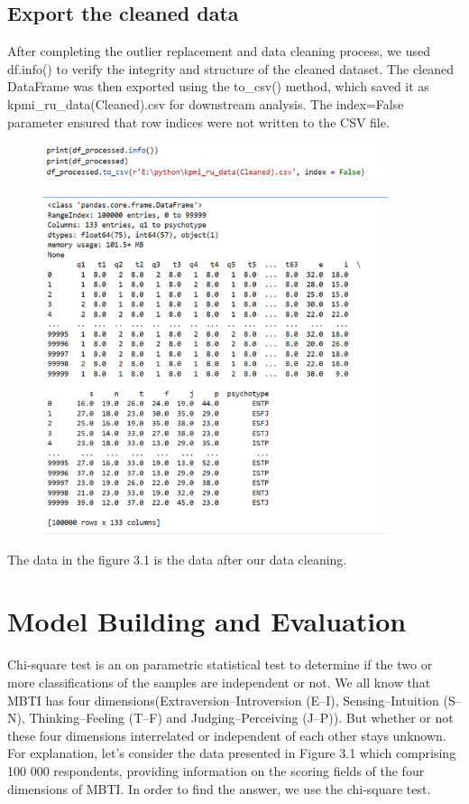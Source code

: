 \documentclass[12pt]{article}
\begin{document}
	\subsection{Export the cleaned data}
	After completing the outlier replacement and data cleaning process, we used df.info() to verify the integrity and structure of the cleaned dataset. The cleaned DataFrame was then exported using the to\_csv() method, which saved it as kpmi\_ru\_data(Cleaned).csv for downstream analysis. The index=False parameter ensured that row indices were not written to the CSV file.
	\begin{figure}[H]
		\centering
		\includegraphics[width=0.9\textwidth]{Q1P6}
		
	\end{figure}
	\begin{figure}[H]
		\centering
		\includegraphics[width=0.9\textwidth]{Q1P7}
		
	\end{figure}
	The data in the figure 3.1 is the data after our data cleaning.
	
	\section{Model Building and Evaluation}
	Chi-square test is an on parametric statistical test to determine if the two or more classifications of the samples are independent or not\cite{zibran2007chi}. We all know that MBTI has four dimensions(Extraversion–Introversion (E–I), Sensing–Intuition (S–N), Thinking–Feeling (T–F) and Judging–Perceiving (J–P)). But whether or not these four dimensions interrelated or independent of each other stays unknown. For explanation, let’s consider the data presented in Figure 3.1 which comprising 100 000 respondents, providing information on the scoring fields of the four dimensions of MBTI. In order to find the answer, we use the chi-square test.
	
\end{document}
